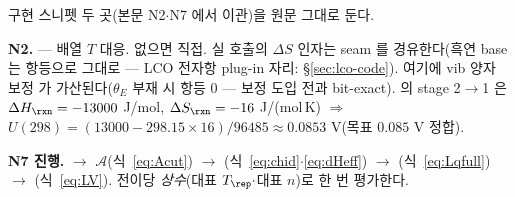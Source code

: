 구현 스니펫 두 곳(본문 N2$\cdot$N7 에서 이관)을 원문 그대로 둔다.
\begin{codebox}
\textbf{N2.} 
--- 배열 $T$ 대응. 없으면  직접. 실 호출의 $\Delta S$ 인자는 seam
 를 경유한다(흑연 base 는 항등으로  그대로 ---
LCO 전자항 plug-in 자리: \S\ref{sec:lco-code}). 여기에 vib 양자 보정  가
가산된다($\theta_E$ 부재 시 항등 $0$ --- 보정 도입 전과 bit-exact).  의 stage 2$\to$1 은
$\Delta H_\rxn=-13000$ J/mol, $\Delta S_\rxn=-16$ J/(mol\,K) $\Rightarrow$ $U(298)=(13000-298.15\times16)/96485
\approx0.0853$ V(목표 $0.085$ V 정합).
\end{codebox}
\begin{codebox}
\textbf{N7 진행.}  $\to$ $\mathcal A$(식~\eqref{eq:Acut}) $\to$
 (식~\eqref{eq:chid}$\cdot$\eqref{eq:dHeff}) $\to$
 (식~\eqref{eq:Lqfull}) $\to$  (식~\eqref{eq:LV}).
전이당 \emph{상수}(대표 $T_\rep\cdot$대표 $n$)로 한 번 평가한다.
\end{codebox}

